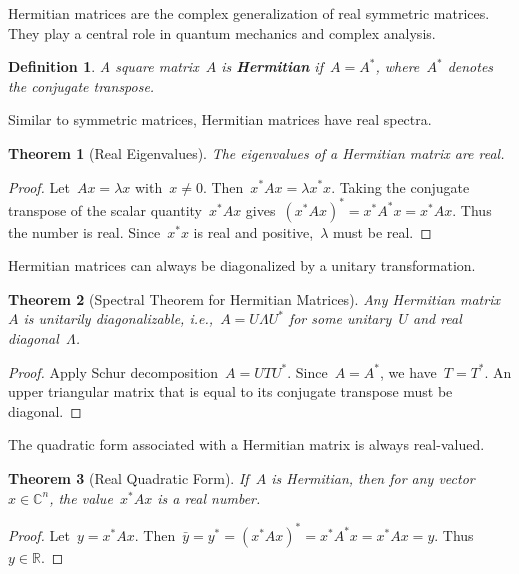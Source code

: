 \documentclass[12pt]{article}
\newtheorem{theorem}{Theorem}[section]
\newtheorem{definition}{Definition}[section]
\begin{document}
Hermitian matrices are the complex generalization of real symmetric matrices. They play a central role in quantum mechanics and complex analysis.

\begin{definition}
    A square matrix~$A$ is \textbf{Hermitian} if~$A = A^*$, where~$A^*$ denotes the conjugate transpose.
\end{definition}

Similar to symmetric matrices, Hermitian matrices have real spectra.

\begin{theorem}[Real Eigenvalues]
    The eigenvalues of a Hermitian matrix are real.
\end{theorem}

\begin{proof}
    Let~$Ax = \lambda x$ with~$x \neq 0$. Then~$x^* A x = \lambda x^* x$. Taking the conjugate transpose of the scalar quantity~$x^* A x$ gives~$(x^* A x)^* = x^* A^* x = x^* A x$. Thus the number is real. Since~$x^* x$ is real and positive,~$\lambda$ must be real.
\end{proof}

Hermitian matrices can always be diagonalized by a unitary transformation.

\begin{theorem}[Spectral Theorem for Hermitian Matrices]
    Any Hermitian matrix~$A$ is unitarily diagonalizable, i.e.,~$A = U \Lambda U^*$ for some unitary~$U$ and real diagonal~$\Lambda$.
\end{theorem}

\begin{proof}
    Apply Schur decomposition~$A = U T U^*$. Since~$A = A^*$, we have~$T = T^*$. An upper triangular matrix that is equal to its conjugate transpose must be diagonal.
\end{proof}

The quadratic form associated with a Hermitian matrix is always real-valued.

\begin{theorem}[Real Quadratic Form]
    If~$A$ is Hermitian, then for any vector~$x \in \mathbb{C}^n$, the value~$x^* A x$ is a real number.
\end{theorem}

\begin{proof}
    Let~$y = x^* A x$. Then~$\bar{y} = y^* = (x^* A x)^* = x^* A^* x = x^* A x = y$. Thus~$y \in \mathbb{R}$.
\end{proof}
\end{document}
